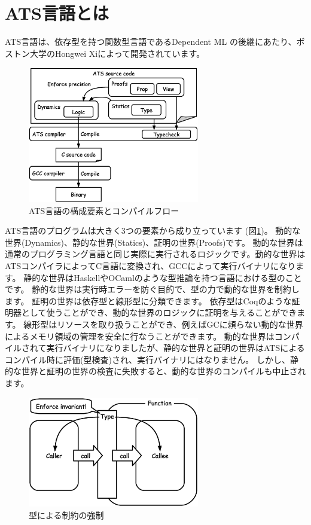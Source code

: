 \documentclass{ipsjprosym}
\begin{document}
\section{ATS言語とは}

ATS言語は、依存型を持つ関数型言語であるDependent ML \cite{Dependent-ML-Thesis} の後継にあたり、ボストン大学のHongwei Xiによって開発されています。

\begin{figure}[h]
\centering
\includegraphics[width=75mm]{draw/flow.eps}
\caption{ATS言語の構成要素とコンパイルフロー}
\label{fig:flow}
\end{figure}

ATS言語のプログラムは大きく3つの要素から成り立っています (図\ref{fig:flow})。 動的な世界(Dynamics)、静的な世界(Statics)、証明の世界(Proofs)です。 動的な世界は通常のプログラミング言語と同じ実際に実行されるロジックです。動的な世界はATSコンパイラによってC言語に変換され、GCCによって実行バイナリになります。 静的な世界はHaskellやOCamlのような型推論を持つ言語における型のことです。 静的な世界は実行時エラーを防ぐ目的で、型の力で動的な世界を制約します。 証明の世界は依存型と線形型に分類できます。 依存型はCoqのような証明器として使うことができ、動的な世界のロジックに証明を与えることができます。 線形型はリソースを取り扱うことができ、例えばGCに頼らない動的な世界によるメモリ領域の管理を安全に行なうことができます。 動的な世界はコンパイルされて実行バイナリになりましたが、静的な世界と証明の世界はATSによるコンパイル時に評価(型検査)され、実行バイナリにはなりません。 しかし、静的な世界と証明の世界の検査に失敗すると、動的な世界のコンパイルも中止されます。

\begin{figure}[h]
\centering
\includegraphics[width=75mm]{draw/enforce_invariant.eps}
\caption{型による制約の強制}
\label{fig:enforce_invariant}
\end{figure}
\end{document}
